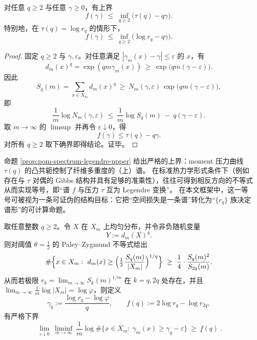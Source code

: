 

\begin{proposition}\label{prop:pom-spectrum-legendre-upper}
对任意 \(q\ge 2\) 与任意 \(\gamma\ge 0\)，有上界
$$
f(\gamma)\ \le\ \inf_{q\ge 2}\bigl(\tau(q)-q\gamma\bigr).
$$
特别地，在 \(\tau(q)=\log r_q\) 的情形下，
$$
f(\gamma)\ \le\ \inf_{q\ge 2}\bigl(\log r_q-q\gamma\bigr).
$$
\end{proposition}

\begin{proof}
固定 \(q\ge 2\) 与 \(\gamma,\varepsilon\)。对任意满足 \(|\gamma_m(x)-\gamma|\le\varepsilon\) 的 \(x\)，有
$$
d_m(x)^q=\exp(qm\gamma_m(x))\ \ge\ \exp\bigl(qm(\gamma-\varepsilon)\bigr).
$$
因此
$$
S_q(m)=\sum_{x\in X_m} d_m(x)^q
\ \ge\ N_m(\gamma,\varepsilon)\,\exp\bigl(qm(\gamma-\varepsilon)\bigr),
$$
即
$$
\frac{1}{m}\log N_m(\gamma,\varepsilon)\ \le\ \frac{1}{m}\log S_q(m)\ -\ q(\gamma-\varepsilon).
$$
取 \(m\to\infty\) 的 \(\limsup\) 并再令 \(\varepsilon\downarrow 0\)，得
$$
f(\gamma)\le \tau(q)-q\gamma.
$$
对所有 \(q\ge 2\) 取下确界即得结论。证毕。
\end{proof}

\begin{remark}\label{rem:pom-spectrum-formalism}
命题 \ref{prop:pom-spectrum-legendre-upper} 给出严格的上界：moment 压力曲线 \(\tau(q)\) 的凸共轭控制了纤维多重度的（上）谱。
在标准热力学形式条件下（例如存在与 \(\tau\) 对偶的 Gibbs 结构并具有足够的准乘性），往往可得到相反方向的不等式从而实现等号，即“谱 \(f\) 与压力 \(\tau\) 互为 Legendre 变换”。
在本文框架中，这一等号可被视为一条可证伪的结构目标：它把“空间损失是一条谱”转化为“\(\{r_q\}\) 族决定谱形”的可计算命题。
\end{remark}

\begin{proposition}\label{prop:pom-spectrum-pz-lower}
取任意整数 \(q\ge 2\)。令 \(X\) 在 \(X_m\) 上均匀分布，并令非负随机变量
\[
Y:=d_m(X)^q.
\]
则对阈值 \(\theta=\tfrac12\) 的 Paley--Zygmund 不等式给出
\[
\#\Bigl\{x\in X_m:\ d_m(x)\ge \Bigl(\tfrac12\,\frac{S_q(m)}{|X_m|}\Bigr)^{1/q}\Bigr\}
\ \ge\ \frac14\cdot\frac{S_q(m)^2}{S_{2q}(m)}.
\]
从而若极限 \(r_k=\lim_{m\to\infty}S_k(m)^{1/m}\) 在 \(k=q,2q\) 处存在，并且 \(\lim_{m\to\infty}\frac1m\log|X_m|=\log\varphi\)，则定义
\[
\gamma_q:=\frac{\log r_q-\log\varphi}{q},
\qquad
\underline f(q):=2\log r_q-\log r_{2q},
\]
有严格下界
\[
\boxed{\;
\lim_{\varepsilon\downarrow 0}\ \liminf_{m\to\infty}\ \frac1m
\log \#\bigl\{x\in X_m:\ \gamma_m(x)\ge \gamma_q-\varepsilon\bigr\}
\ \ge\ \underline f(q)\; }.
\]
\end{proposition}


